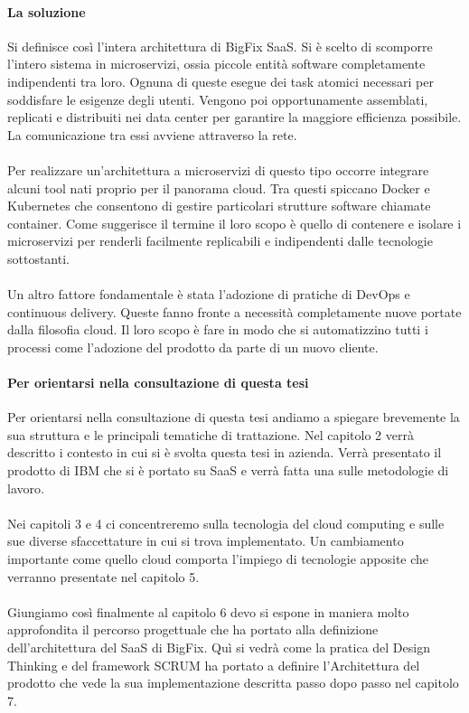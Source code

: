 \paragraph{La soluzione}
Si definisce così l'intera architettura di BigFix SaaS. Si è scelto di scomporre l'intero sistema in microservizi, ossia piccole entità software completamente indipendenti tra loro. Ognuna di queste esegue dei task atomici necessari per soddisfare le esigenze degli utenti. Vengono poi opportunamente assemblati, replicati e distribuiti nei data center per garantire la maggiore efficienza possibile. La comunicazione tra essi avviene attraverso la rete.
\paragraph{}
Per realizzare un'architettura a microservizi di questo tipo occorre integrare alcuni tool nati proprio per il panorama cloud. Tra questi spiccano Docker e Kubernetes che consentono di gestire particolari strutture software chiamate container. Come suggerisce il termine il loro scopo è quello di contenere e isolare i microservizi per renderli facilmente replicabili e indipendenti dalle tecnologie sottostanti.
\paragraph{}
Un altro fattore fondamentale è stata l'adozione di pratiche di DevOps e continuous delivery. Queste fanno fronte a necessità completamente nuove portate dalla filosofia cloud. Il loro scopo è fare in modo che si automatizzino tutti i processi come l'adozione del prodotto da parte di un nuovo cliente.

\paragraph{Per orientarsi nella consultazione di questa tesi}Per orientarsi nella consultazione di questa tesi andiamo a spiegare brevemente la sua struttura e le principali tematiche di trattazione. Nel capitolo 2 verrà descritto i contesto in cui si è svolta questa tesi in azienda. Verrà presentato il prodotto di IBM che si è portato su SaaS e verrà fatta una sulle metodologie di lavoro.
\paragraph{}
Nei capitoli 3 e 4 ci concentreremo sulla tecnologia del cloud computing e sulle sue diverse sfaccettature in cui si trova implementato. Un cambiamento importante come quello cloud comporta l'impiego di tecnologie apposite che verranno presentate nel capitolo 5.
\paragraph{}
Giungiamo così finalmente al capitolo 6 devo si espone in maniera molto approfondita il percorso progettuale che ha portato alla definizione dell'architettura del SaaS di BigFix. Quì si vedrà come la pratica del Design Thinking e del framework SCRUM ha portato a definire l'Architettura del prodotto che vede la sua implementazione descritta passo dopo passo nel capitolo 7.